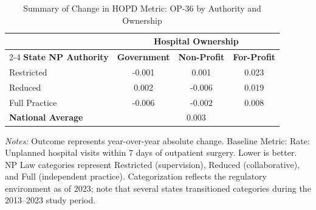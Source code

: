 \begin{table}[htbp]
    \centering
    \caption{Summary of Change in HOPD Metric: OP-36 by Authority and Ownership}
    \label{tab:d_hopd_op_36}
    \vspace{0.2cm}
    \begin{tabular}{lccc}
        \toprule
        & \multicolumn{3}{c}{\textbf{Hospital Ownership}} \\
        \cmidrule(lr){2-4}
        \textbf{State NP Authority} & \textbf{Government} & \textbf{Non-Profit} & \textbf{For-Profit} \\
        \midrule
        Restricted & -0.001 & 0.001 & 0.023 \\
        Reduced & 0.002 & -0.006 & 0.019 \\
        Full Practice & -0.006 & -0.002 & 0.008 \\
        \midrule
        \textbf{National Average} & \multicolumn{3}{c}{0.003} \\
        \bottomrule
    \end{tabular}
    \vspace{0.1cm}
    \begin{minipage}{0.85\textwidth}
        \footnotesize \textit{Notes:} Outcome represents year-over-year absolute change. Baseline Metric: Rate: Unplanned hospital visits within 7 days of outpatient surgery. Lower is better. NP Law categories represent Restricted (supervision), Reduced (collaborative), and Full (independent practice). Categorization reflects the regulatory environment as of 2023; note that several states transitioned categories during the 2013--2023 study period.
    \end{minipage}
\end{table}